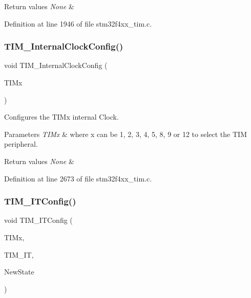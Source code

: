 \begin{DoxyRetVals}{Return values}
{\em None} & \\
\hline
\end{DoxyRetVals}


Definition at line 1946 of file stm32f4xx\+\_\+tim.\+c.

\mbox{\label{group___t_i_m_ga2394f0221709c0659874f9a4184cf86e}} 
\subsubsection{\texorpdfstring{T\+I\+M\+\_\+\+Internal\+Clock\+Config()}{TIM\_InternalClockConfig()}}
{\footnotesize\ttfamily void T\+I\+M\+\_\+\+Internal\+Clock\+Config (\begin{DoxyParamCaption}\item[{\hyperlink{struct_t_i_m___type_def}{T\+I\+M\+\_\+\+Type\+Def} $\ast$}]{T\+I\+Mx }\end{DoxyParamCaption})}



Configures the T\+I\+Mx internal Clock. 


\begin{DoxyParams}{Parameters}
{\em T\+I\+Mx} & where x can be 1, 2, 3, 4, 5, 8, 9 or 12 to select the T\+IM peripheral. \\
\hline
\end{DoxyParams}

\begin{DoxyRetVals}{Return values}
{\em None} & \\
\hline
\end{DoxyRetVals}


Definition at line 2673 of file stm32f4xx\+\_\+tim.\+c.

\mbox{\label{group___t_i_m_ga70e3d6c09d55ee69002e154c85cd40e4}} 
\subsubsection{\texorpdfstring{T\+I\+M\+\_\+\+I\+T\+Config()}{TIM\_ITConfig()}}
{\footnotesize\ttfamily void T\+I\+M\+\_\+\+I\+T\+Config (\begin{DoxyParamCaption}\item[{\hyperlink{struct_t_i_m___type_def}{T\+I\+M\+\_\+\+Type\+Def} $\ast$}]{T\+I\+Mx,  }\item[{uint16\+\_\+t}]{T\+I\+M\+\_\+\+IT,  }\item[{Functional\+State}]{New\+State }\end{DoxyParamCaption})}



